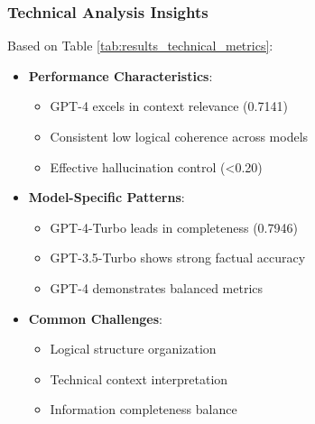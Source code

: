 \subsubsection{Technical Analysis Insights}
Based on Table \ref{tab:results_technical_metrics}:
\begin{itemize}
    \item \textbf{Performance Characteristics}:
    \begin{itemize}
        \item GPT-4 excels in context relevance (0.7141)
        \item Consistent low logical coherence across models
        \item Effective hallucination control (<0.20)
    \end{itemize}
    \item \textbf{Model-Specific Patterns}:
    \begin{itemize}
        \item GPT-4-Turbo leads in completeness (0.7946)
        \item GPT-3.5-Turbo shows strong factual accuracy
        \item GPT-4 demonstrates balanced metrics
    \end{itemize}
    \item \textbf{Common Challenges}:
    \begin{itemize}
        \item Logical structure organization
        \item Technical context interpretation
        \item Information completeness balance
    \end{itemize}
\end{itemize}

